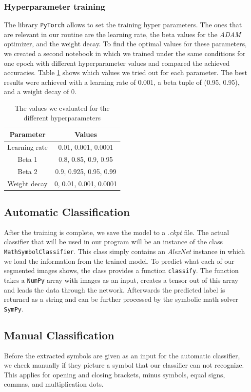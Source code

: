 \documentclass[12pt]{article}
\begin{document}
\begin{itemize}
\begin{itemize}
\begin{itemize}
\begin{itemize}
\begin{itemize}
\begin{itemize}
\begin{itemize}
\begin{itemize}
\begin{itemize}
\begin{itemize}
	\subsubsection{Hyperparameter training}
	The library \texttt{PyTorch} allows to set the training hyper parameters. The ones that are relevant in our routine are the learning rate, the beta values for the \textit{ADAM} optimizer, and the weight decay. To find the optimal values for these parameters, we created a second notebook in which we trained under the same conditions for one epoch with different hyperparameter values and compared the achieved accuracies. Table \ref{tab:hyperparams} shows which values we tried out for each parameter. The best results were achieved with a learning rate of 0.001, a beta tuple of (0.95, 0.95), and a weight decay of 0.
	\begin{table}[h!]
		\begin{tabular}{c|c}
			\textbf{Parameter} & \textbf{Values} \\
			\hline
			Learning rate & 0.01, 0.001, 0.0001 \\
			Beta 1 & 0.8, 0.85, 0.9, 0.95 \\
			Beta 2 & 0.9, 0.925, 0.95, 0.99 \\
			Weight decay & 0, 0.01, 0.001, 0.0001
		\end{tabular}
		\caption{The values we evaluated for the different hyperparameters}
		\label{tab:hyperparams}
	\end{table}
	
	\subsection{Automatic Classification}
	After the training is complete, we save the model to a \textit{.ckpt} file. The actual classifier that will be used in our program will be an instance of the class \texttt{MathSymbolClassifier}. This class simply contains an \textit{AlexNet} instance in which we load the information from the trained model. To predict what each of our segmented images shows, the class provides a function \texttt{classify}. The function takes a \texttt{NumPy} array with images as an input, creates a tensor out of this array and leads the data through the network. Afterwards the predicted label is returned as a string and can be further processed by the symbolic math solver \texttt{SymPy}.
	
	\subsection{Manual Classification}
	Before the extracted symbols are given as an input for the automatic classifier, we check manually if they picture a symbol that our classifier can not recognize. This applies for opening and closing brackets, minus symbols, equal signs, commas, and multiplication dots.


\end{itemize}
\end{itemize}
\end{itemize}
\end{itemize}
\end{itemize}
\end{itemize}
\end{itemize}
\end{itemize}
\end{itemize}
\end{itemize}
\end{document}
